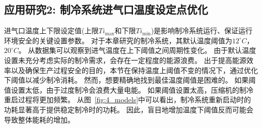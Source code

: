 \subsection{应用研究2: 制冷系统进气口温度设定点优化}
\label{sub:case-study2}
进气口温度上下限设定值(上限$Ti_{\max}$和下限$Ti_{\min}$)是影响制冷系统运行、保证运行环境安全的关键设置参数。
对于本章研究的制冷系统，其默认温度阈值为$12^\circ C$，$20^\circ C$。
从数据集可以观察到进气温度在上下阈值之间周期性变化。
由于默认温度设置未充分考虑实际的制冷需求，会存在一定程度的能源浪费。
出于提高能源效率以及确保生产过程安全的目的，本节在保持温度上阈值不变的情况下，通过优化下阈值以减少制冷消耗。
然而，想要精确地找到最佳温度阈值是困难的。
如果阈值设置太低，由于过度制冷会浪费大量电能。
如果阈值设置太高，压缩机的制冷重启过程将更加频繁。
从图~\ref{fig:4_models}中可以看出，制冷系统重新启动时的功耗显著高于提供稳定制冷时的功耗。
因此，盲目地增加温度下阈值反而可能会导致整体能耗的增加。

